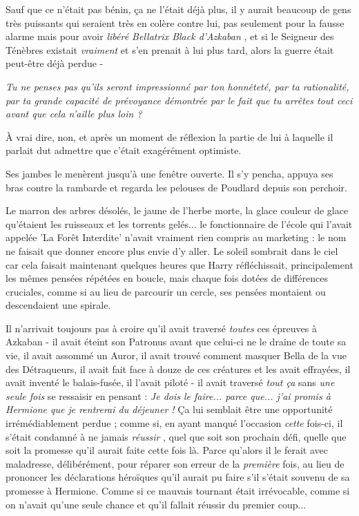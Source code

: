 Sauf que ce n'était pas bénin, ça ne l'était déjà plus, il y aurait beaucoup de gens très puissants qui seraient très en colère contre lui, pas seulement pour la fausse alarme mais pour avoir \emph{libéré Bellatrix Black d'Azkaban} , et si le Seigneur des Ténèbres existait \emph{vraiment } et s'en prenait à lui plus tard, alors la guerre était peut-être déjà perdue -

\emph{Tu ne penses pas qu'ils seront impressionné par ton honnêteté, par ta rationalité, par ta grande capacité de prévoyance démontrée par le fait que tu arrêtes tout ceci avant que cela n'aille plus loin ?} 

À vrai dire, non, et après un moment de réflexion la partie de lui à laquelle il parlait dut admettre que c'était exagérément optimiste.

Ses jambes le menèrent jusqu'à une fenêtre ouverte. Il s'y pencha, appuya ses bras contre la rambarde et regarda les pelouses de Poudlard depuis son perchoir.

Le marron des arbres désolés, le jaune de l'herbe morte, la glace couleur de glace qu'étaient les ruisseaux et les torrents gelés... le fonctionnaire de l'école qui l'avait appelée 'La Forêt Interdite' n'avait vraiment rien compris au marketing : le nom ne faisait que donner encore plus envie d'y aller. Le soleil sombrait dans le ciel car cela faisait maintenant quelques heures que Harry réfléchissait, principalement les mêmes pensées répétées en boucle, mais chaque fois dotées de différences cruciales, comme si au lieu de parcourir un cercle, ses pensées montaient ou descendaient une spirale.

Il n'arrivait toujours pas à croire qu'il avait traversé \emph{toutes } ces épreuves à Azkaban - il avait éteint son Patronus avant que celui-ci ne le draine de toute sa vie, il avait assommé un Auror, il avait trouvé comment masquer Bella de la vue des Détraqueurs, il avait fait face à douze de ces créatures et les avait effrayées, il avait inventé le balais-fusée, il l'avait piloté - il avait traversé \emph{tout ça}  sans \emph{une seule fois}  se ressaisir en pensant : \emph{Je dois le faire... parce que... j'ai promis à Hermione que je rentrerai du déjeuner ! } Ça lui semblait être une opportunité irrémédiablement perdue ; comme si, en ayant manqué l'occasion \emph{cette}  fois-ci, il s'était condamné à ne jamais \emph{réussir} , quel que soit son prochain défi, quelle que soit la promesse qu'il aurait faite cette fois là. Parce qu'alors il le ferait avec maladresse, délibérément, pour réparer son erreur de la \emph{première}  fois, au lieu de prononcer les déclarations héroïques qu'il aurait pu faire s'il s'était souvenu de sa promesse à Hermione. Comme si ce mauvais tournant était irrévocable, comme si on n'avait qu'une seule chance et qu'il fallait réussir du premier coup...

